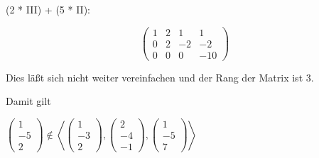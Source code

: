 \documentclass{article}
\begin{document}
(2 * III) + (5 * II):

\[
\begin{pmatrix}
    1 & 2 & 1 & 1 \\
    0 & 2 & -2 & -2 \\
    0 & 0 & 0 & -10
\end{pmatrix}
\]

Dies läßt sich nicht weiter vereinfachen und der Rang der Matrix ist 3.

Damit gilt

\(
\begin{pmatrix}
    1 \\
    -5 \\
    2
\end{pmatrix}
\not\in
\left <
\begin{pmatrix}
    1 \\
    -3 \\
    2
\end{pmatrix}
,
\begin{pmatrix}
    2 \\
    -4 \\
    -1
\end{pmatrix}
,
\begin{pmatrix}
    1 \\
    -5 \\
    7
\end{pmatrix}
\right >
\)
\end{document}
